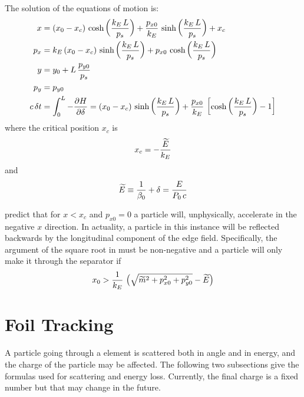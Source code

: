 The solution of the equations of motion is:
\begin{align}
  x   &= (x_0 - x_c) \, \cosh \left( \frac{k_E \, L}{p_s} \right) + 
         \frac{p_{x0}}{k_E} \, \sinh \left( \frac{k_E \, L}{p_s} \right) + x_c \nonumber \\
  p_x &= k_E \, (x_0 - x_c) \, \sinh \left( \frac{k_E \, L}{p_s} \right) + 
         {p_{x0}} \, \cosh \left( \frac{k_E \, L}{p_s} \right) \nonumber \\
  y   &= y_0 + L \, \frac{p_{y0}}{p_s} \label{xxlp} \\
  p_y &= p_{y0} \nonumber \\
  c \, \delta t &=  \int_0^L -\frac{\partial H}{\partial \delta}
      = (x_0 - x_c) \, \sinh \left( \frac{k_E \, L}{p_s} \right) +
        \frac{p_{x0}}{k_E} \, \left[ \cosh \left( \frac{k_E \, L}{p_s} \right) - 1 \right]
        \nonumber
\end{align}
where the critical position $x_c$ is
\begin{equation} 
  x_c = -\frac{\widetilde E}{k_E}
\end{equation}
and 
\begin{equation}
  \widetilde E \equiv \frac{1}{\beta_0} + \delta = \frac{E}{P_0 \, c}
\end{equation}
 
 predict that for $x < x_c$ and $p_{x0} = 0$ a particle will, unphysically, accelerate in
the negative $x$ direction. In actuality, a particle in this instance will be reflected backwards by
the longitudinal component of the edge field. Specifically, the argument of the square root in
 must be non-negative and a particle will only make it through the separator if
\begin{equation}
  x_0 > \frac{1}{k_E} \, \left( \sqrt{\widetilde m^2 + p_{x0}^2 + p_{y0}^2} - \widetilde E \right)
\end{equation}

\section{Foil Tracking}
\label{s:foil.std}

A particle going through a  element is scattered both in angle and in energy, and the
charge of the particle may be affected. The following two subsections give the formulas used for
scattering and energy loss. Currently, the final charge is a fixed number but that may change in the
future.

